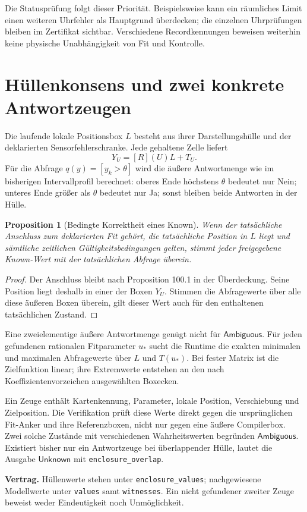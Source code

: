 \documentclass[11pt,a4paper]{article}
\newcommand{\Unknown}{\ensuremath{\mathsf{Unknown}}}
\newcommand{\Ambiguous}{\ensuremath{\mathsf{Ambiguous}}}
\newcommand{\contract}[1]{\vspace{3pt}\noindent\colorbox{pale}{\parbox{\dimexpr\linewidth-2\fboxsep}{\textbf{Vertrag.} #1}}\vspace{5pt}}
\newcommand{\nextsection}[2]{\clearpage{\color{accent}\small\textsf{#1}}\section{#2}}
\newtheorem{proposition}{Proposition}[section]
\begin{document}
Die Statusprüfung folgt dieser Priorität. Beispielsweise kann
ein räumliches Limit einen weiteren Uhrfehler als Hauptgrund
überdecken; die einzelnen Uhrprüfungen bleiben im Zertifikat
sichtbar. Verschiedene Recordkennungen beweisen weiterhin keine
physische Unabhängigkeit von Fit und Kontrolle.

\nextsection{102 / ANTWORTKORREKTHEIT}{Hüllenkonsens und zwei konkrete Antwortzeugen}
Die laufende lokale Positionsbox $L$ besteht aus ihrer
Darstellungshülle und der deklarierten Sensorfehlerschranke.
Jede gehaltene Zelle liefert
\[
 Y_U=[R](U)L+T_U.
\]
Für die Abfrage $q(y)=[y_k>\theta]$ wird die äußere Antwortmenge
wie im bisherigen Intervallprofil berechnet: oberes Ende
höchstens $\theta$ bedeutet nur Nein; unteres Ende größer als
$\theta$ bedeutet nur Ja; sonst bleiben beide Antworten in der Hülle.

\begin{proposition}[Bedingte Korrektheit eines Known]
Wenn der tatsächliche Anschluss zum deklarierten Fit gehört,
die tatsächliche Position in $L$ liegt und sämtliche zeitlichen
Gültigkeitsbedingungen gelten, stimmt jeder freigegebene
Known-Wert mit der tatsächlichen Abfrage überein.
\end{proposition}
\begin{proof}
Der Anschluss bleibt nach Proposition 100.1 in der Überdeckung.
Seine Position liegt deshalb in einer der Boxen $Y_U$. Stimmen
die Abfragewerte über alle diese äußeren Boxen überein, gilt
dieser Wert auch für den enthaltenen tatsächlichen Zustand.
\end{proof}

Eine zweielementige äußere Antwortmenge genügt nicht für
\Ambiguous. Für jeden gefundenen rationalen Fitparameter
$u_*$ sucht die Runtime die exakten minimalen und maximalen
Abfragewerte über $L$ und $T(u_*)$. Bei fester Matrix ist die
Zielfunktion linear; ihre Extremwerte entstehen an den nach
Koeffizientenvorzeichen ausgewählten Boxecken.

Ein Zeuge enthält Kartenkennung, Parameter, lokale Position,
Verschiebung und Zielposition. Die Verifikation prüft diese
Werte direkt gegen die ursprünglichen Fit-Anker und ihre
Referenzboxen, nicht nur gegen eine äußere Compilerbox.
Zwei solche Zustände mit verschiedenen Wahrheitswerten begründen
\Ambiguous. Existiert bisher nur ein Antwortzeuge bei überlappender
Hülle, lautet die Ausgabe \Unknown{} mit
\texttt{enclosure\_overlap}.

\contract{Hüllenwerte stehen unter \texttt{enclosure\_values};
nachgewiesene Modellwerte unter \texttt{values} samt
\texttt{witnesses}. Ein nicht gefundener zweiter Zeuge beweist
weder Eindeutigkeit noch Unmöglichkeit.}
\end{document}
